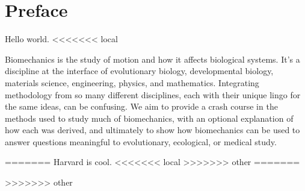 \chapter*{Preface}

Hello world.
<<<<<<< local

Biomechanics is the study of motion and how it affects biological systems. It's a discipline at the interface of evolutionary biology, developmental biology, materials science, engineering, physics, and mathematics. Integrating methodology from so many different disciplines, each with their unique lingo for the same ideas, can be confusing. We aim to provide a crash course in the methods used to study much of biomechanics, with an optional explanation of how each was derived, and ultimately to show how biomechanics can be used to answer questions meaningful to evolutionary, ecological, or medical study.


=======
Harvard is cool.
<<<<<<< local
>>>>>>> other
=======

>>>>>>> other


